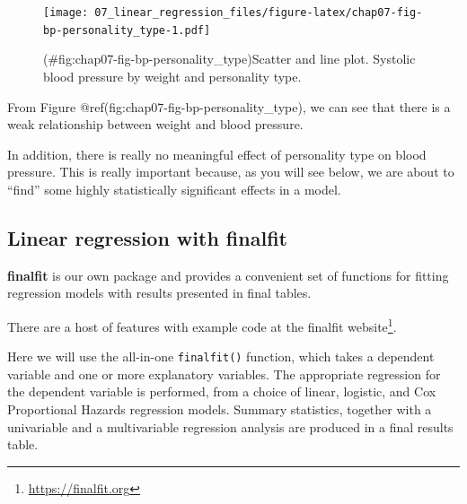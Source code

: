 \documentclass[
  12pt,
  krantz2]{krantz}
\makeatletter
\newenvironment{Shaded}{\begin{snugshade}}{\end{snugshade}}
\newcommand{\DataTypeTok}[1]{\textcolor[rgb]{0.13,0.29,0.53}{#1}}
\newcommand{\KeywordTok}[1]{\textcolor[rgb]{0.13,0.29,0.53}{\textbf{#1}}}
\newcommand{\NormalTok}[1]{#1}
\newcommand{\OperatorTok}[1]{\textcolor[rgb]{0.81,0.36,0.00}{\textbf{#1}}}
\newcommand{\OtherTok}[1]{\textcolor[rgb]{0.56,0.35,0.01}{#1}}
\newcommand{\StringTok}[1]{\textcolor[rgb]{0.31,0.60,0.02}{#1}}
\renewcommand{\href}[2]{#2\footnote{\url{#1}}}
\newenvironment{kframe}{%
\medskip{}
\setlength{\fboxsep}{.8em}
 \def\at@end@of@kframe{}%
 \ifinner\ifhmode%
  \def\at@end@of@kframe{\end{minipage}}%
  \begin{minipage}{\columnwidth}%
 \fi\fi%
 \def\FrameCommand##1{\hskip\@totalleftmargin \hskip-\fboxsep
 \colorbox{shadecolor}{##1}\hskip-\fboxsep
     \hskip-\linewidth \hskip-\@totalleftmargin \hskip\columnwidth}%
 \MakeFramed {\advance\hsize-\width
   \@totalleftmargin\z@ \linewidth\hsize
   \@setminipage}}%
 {\par\unskip\endMakeFramed%
 \at@end@of@kframe}
\renewenvironment{Shaded}{\begin{kframe}}{\end{kframe}}
\makeatother
\begin{document}
\begin{figure}
\centering
\texttt{[image: 07\_linear\_regression\_files/figure-latex/chap07-fig-bp-personality\_type-1.pdf]}
\caption{(\#fig:chap07-fig-bp-personality\_type)Scatter and line plot. Systolic blood pressure by weight and personality type.}
\end{figure}

From Figure @ref(fig:chap07-fig-bp-personality\_type), we can see that there is a weak relationship between weight and blood pressure.

In addition, there is really no meaningful effect of personality type on blood pressure.
This is really important because, as you will see below, we are about to ``find'' some highly statistically significant effects in a model.

\hypertarget{linear-regression-with-finalfit}{%
\subsection{Linear regression with finalfit}\label{linear-regression-with-finalfit}}


\textbf{finalfit} is our own package and provides a convenient set of functions for fitting regression models with results presented in final tables.

There are a host of features with example code at the \href{https://finalfit.org}{finalfit website}.

Here we will use the all-in-one \texttt{finalfit()} function, which takes a dependent variable and one or more explanatory variables.
The appropriate regression for the dependent variable is performed, from a choice of linear, logistic, and Cox Proportional Hazards regression models.
Summary statistics, together with a univariable and a multivariable regression analysis are produced in a final results table.

\begin{Shaded}
\end{Shaded}
\end{document}
